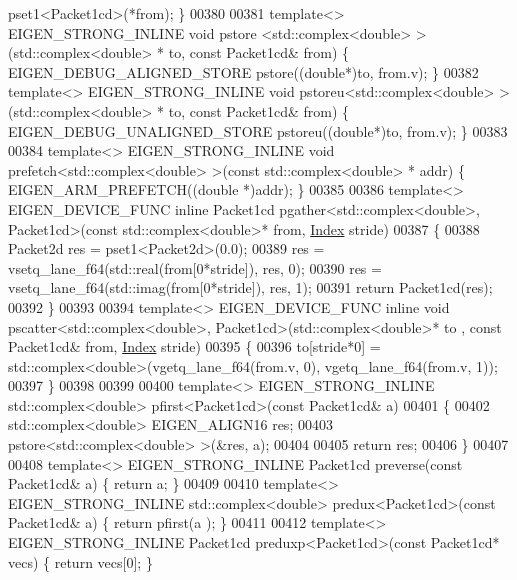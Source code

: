 \begin{DoxyCode}
      pset1<Packet1cd>(*from); \}
00380 
00381 \textcolor{keyword}{template}<> EIGEN\_STRONG\_INLINE \textcolor{keywordtype}{void} pstore <std::complex<double> >(std::complex<double> *   to, \textcolor{keyword}{const} 
      Packet1cd& from) \{ EIGEN\_DEBUG\_ALIGNED\_STORE pstore((\textcolor{keywordtype}{double}*)to, from.v); \}
00382 \textcolor{keyword}{template}<> EIGEN\_STRONG\_INLINE \textcolor{keywordtype}{void} pstoreu<std::complex<double> >(std::complex<double> *   to, \textcolor{keyword}{const} 
      Packet1cd& from) \{ EIGEN\_DEBUG\_UNALIGNED\_STORE pstoreu((\textcolor{keywordtype}{double}*)to, from.v); \}
00383 
00384 \textcolor{keyword}{template}<> EIGEN\_STRONG\_INLINE \textcolor{keywordtype}{void} prefetch<std::complex<double> >(\textcolor{keyword}{const} std::complex<double> *   addr) \{ 
      EIGEN\_ARM\_PREFETCH((\textcolor{keywordtype}{double} *)addr); \}
00385 
00386 \textcolor{keyword}{template}<> EIGEN\_DEVICE\_FUNC \textcolor{keyword}{inline} Packet1cd pgather<std::complex<double>, Packet1cd>(\textcolor{keyword}{const} 
      std::complex<double>* from, \hyperlink{namespace_eigen_a62e77e0933482dafde8fe197d9a2cfde}{Index} stride)
00387 \{
00388   Packet2d res = pset1<Packet2d>(0.0);
00389   res = vsetq\_lane\_f64(std::real(from[0*stride]), res, 0);
00390   res = vsetq\_lane\_f64(std::imag(from[0*stride]), res, 1);
00391   \textcolor{keywordflow}{return} Packet1cd(res);
00392 \}
00393 
00394 \textcolor{keyword}{template}<> EIGEN\_DEVICE\_FUNC \textcolor{keyword}{inline} \textcolor{keywordtype}{void} pscatter<std::complex<double>, Packet1cd>(std::complex<double>* to
      , \textcolor{keyword}{const} Packet1cd& from, \hyperlink{namespace_eigen_a62e77e0933482dafde8fe197d9a2cfde}{Index} stride)
00395 \{
00396   to[stride*0] = std::complex<double>(vgetq\_lane\_f64(from.v, 0), vgetq\_lane\_f64(from.v, 1));
00397 \}
00398 
00399 
00400 \textcolor{keyword}{template}<> EIGEN\_STRONG\_INLINE std::complex<double>  pfirst<Packet1cd>(\textcolor{keyword}{const} Packet1cd& a)
00401 \{
00402   std::complex<double> EIGEN\_ALIGN16 res;
00403   pstore<std::complex<double> >(&res, a);
00404 
00405   \textcolor{keywordflow}{return} res;
00406 \}
00407 
00408 \textcolor{keyword}{template}<> EIGEN\_STRONG\_INLINE Packet1cd preverse(\textcolor{keyword}{const} Packet1cd& a) \{ \textcolor{keywordflow}{return} a; \}
00409 
00410 \textcolor{keyword}{template}<> EIGEN\_STRONG\_INLINE std::complex<double> predux<Packet1cd>(\textcolor{keyword}{const} Packet1cd& a) \{ \textcolor{keywordflow}{return} pfirst(a
      ); \}
00411 
00412 \textcolor{keyword}{template}<> EIGEN\_STRONG\_INLINE Packet1cd preduxp<Packet1cd>(\textcolor{keyword}{const} Packet1cd* vecs) \{ \textcolor{keywordflow}{return} vecs[0]; \}

\end{DoxyCode}
